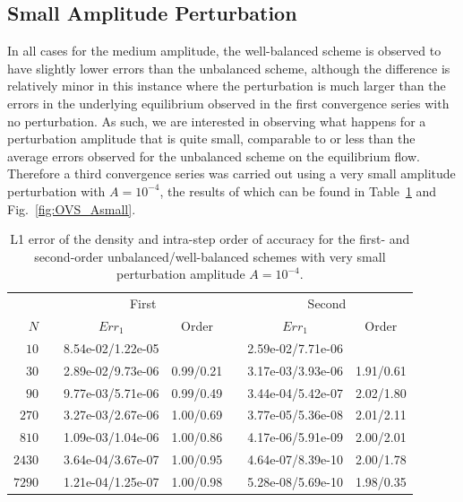 \subsection{Small Amplitude Perturbation}

In all cases for the medium amplitude, the well-balanced scheme is observed to have slightly lower errors than the unbalanced scheme, although the difference is relatively minor in this instance where the perturbation is much larger than the errors in the underlying equilibrium observed in the first convergence series with no perturbation. As such, we are interested in observing what happens for a perturbation amplitude that is quite small, comparable to or less than the average errors observed for the unbalanced scheme on the equilibrium flow. Therefore a third convergence series was carried out using a very small amplitude perturbation with $A=10^{-4}$, the results of which can be found in Table~\ref{table:OVS_Asmall} and Fig.~\ref{fig:OVS_Asmall}.

\begin{table}\centering
\caption{L1 error of the density and intra-step order of accuracy for the first- and second-order unbalanced/well-balanced schemes with very small perturbation amplitude $A=10^{-4}$.}
\label{table:OVS_Asmall}
\begin{tabular}{@{}rcccccc@{}}\toprule
& \phantom{a} & \multicolumn{2}{c}{First} & \phantom{ab} & \multicolumn{2}{c}{Second}\\
\cmidrule{3-4} \cmidrule{6-7}
$N$ && $Err_1$ & Order && $Err_1$ & Order\\ \midrule
$10$ && 8.54e-02/1.22e-05 &&& 2.59e-02/7.71e-06 &\\
$30$ && 2.89e-02/9.73e-06 & 0.99/0.21 && 3.17e-03/3.93e-06 & 1.91/0.61\\
$90$ && 9.77e-03/5.71e-06 & 0.99/0.49 && 3.44e-04/5.42e-07 & 2.02/1.80\\
$270$ && 3.27e-03/2.67e-06 & 1.00/0.69 && 3.77e-05/5.36e-08 & 2.01/2.11\\
$810$ && 1.09e-03/1.04e-06 & 1.00/0.86 && 4.17e-06/5.91e-09 & 2.00/2.01\\
$2430$ && 3.64e-04/3.67e-07 & 1.00/0.95 && 4.64e-07/8.39e-10 & 2.00/1.78\\
$7290$ && 1.21e-04/1.25e-07 & 1.00/0.98 && 5.28e-08/5.69e-10 & 1.98/0.35\\
\bottomrule
\end{tabular}
\end{table}

